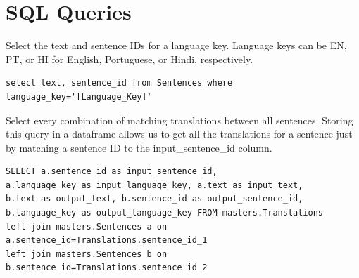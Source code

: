 \documentclass[runningheads]{llncs}
\begin{document}
\appendix
\section{SQL Queries}
Select the text and sentence IDs for a language key. Language keys can be EN, PT, or HI for English, Portuguese, or Hindi, respectively. 

\begin{verbatim}
select text, sentence_id from Sentences where language_key='[Language_Key]'
\end{verbatim}
Select every combination of matching translations between all sentences. Storing this query in a dataframe allows us to get all the translations for a sentence just by matching a sentence ID to the input\_sentence\_id column.

\begin{verbatim}
SELECT a.sentence_id as input_sentence_id, 
a.language_key as input_language_key, a.text as input_text, 
b.text as output_text, b.sentence_id as output_sentence_id, 
b.language_key as output_language_key FROM masters.Translations 
left join masters.Sentences a on a.sentence_id=Translations.sentence_id_1 
left join masters.Sentences b on b.sentence_id=Translations.sentence_id_2
\end{verbatim}
\end{document}
